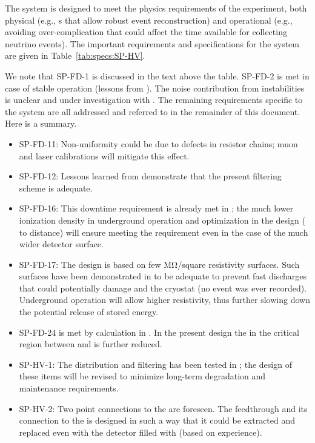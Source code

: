 The  system is designed to meet the physics requirements of the  experiment,  both physical  (e.g., \efield{}s that allow robust event reconstruction) and operational (e.g., avoiding over-complication that could affect 
the time available for collecting neutrino events). 
The important requirements and specifications for the  system are given in Table~\ref{tab:specs:SP-HV}. 



We note that SP-FD-1 is discussed in the text above the table. SP-FD-2  is met in case of stable  operation (lessons from ). The noise contribution from  instabilities is unclear and under investigation with . The remaining requirements specific to the  system are all addressed and referred to in the remainder of this document. Here is a summary. 

\begin{itemize}
\item SP-FD-11: Non-uniformity could be due to defects in resistor chains; muon and laser calibrations will mitigate this effect. 
\item SP-FD-12: Lessons learned from  demonstrate that the present filtering scheme is adequate. 
\item SP-FD-16: This downtime requirement is already met in ; the much lower ionization density in underground operation and optimization in the design ( to  distance) will ensure meeting the requirement even in the case of the much wider detector surface. 
\item SP-FD-17: The  design is based on few \si{\mega\ohm}/square resistivity surfaces. Such surfaces have been demonstrated in  to be adequate to prevent fast discharges that could potentially damage  and the cryostat (no event was ever recorded). Underground operation will allow higher resistivity, thus further slowing down the potential release of stored energy. 
\item SP-FD-24 is met by calculation in . In the present design  the \efield in the critical region between  and  is further reduced. 
\item SP-HV-1: The  distribution and filtering has been tested in ; the design of these items will be revised to minimize long-term degradation and maintenance requirements. 
\item SP-HV-2: Two point connections to the  are foreseen. The  feedthrough and its connection to the  is designed in such a way that it could be extracted and replaced even with the detector filled with  (based on  experience). 
\end{itemize}
